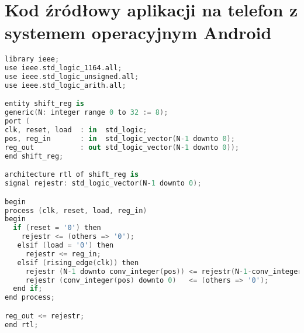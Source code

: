 \chapter{Kod źródłowy aplikacji na telefon z systemem operacyjnym Android}

\begin{lstlisting}[language=Kotlin, xleftmargin=0pt, backgroundcolor={\color{white}}, caption={}, frame=""]
library ieee;
use ieee.std_logic_1164.all;
use ieee.std_logic_unsigned.all;
use ieee.std_logic_arith.all;

entity shift_reg is
generic(N: integer range 0 to 32 := 8);
port (
clk, reset, load  : in  std_logic;
pos, reg_in       : in  std_logic_vector(N-1 downto 0);
reg_out           : out std_logic_vector(N-1 downto 0));
end shift_reg;

architecture rtl of shift_reg is
signal rejestr: std_logic_vector(N-1 downto 0);

begin
process (clk, reset, load, reg_in)
begin
  if (reset = '0') then 
    rejestr <= (others => '0');
   elsif (load = '0') then
     rejestr <= reg_in;
   elsif (rising_edge(clk)) then
     rejestr (N-1 downto conv_integer(pos)) <= rejestr(N-1-conv_integer(pos) downto 0);
     rejestr (conv_integer(pos) downto 0)   <= (others => '0');
  end if;
end process;

reg_out <= rejestr;
end rtl;
\end{lstlisting}
